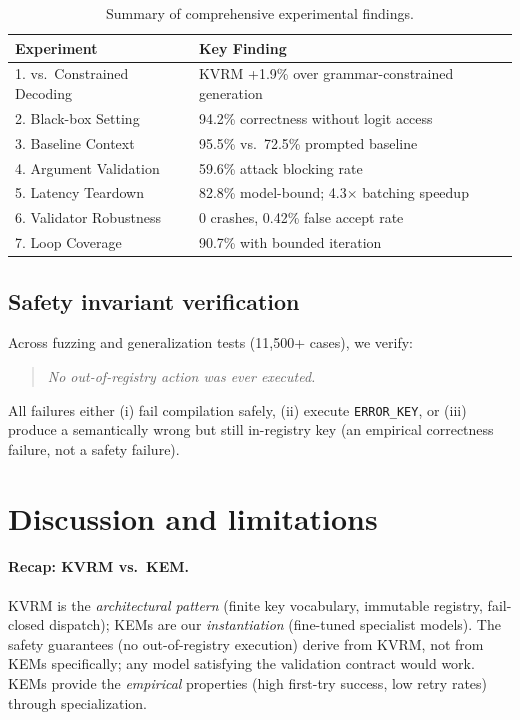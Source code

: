 \documentclass[11pt]{article}
\begin{document}
\begin{table}[h]
\centering
\caption{Summary of comprehensive experimental findings.}
\label{tab:v5_summary}
\begin{tabular}{p{5.5cm}p{8.5cm}}
\toprule
Experiment & Key Finding \\
\midrule
1. vs.\ Constrained Decoding & KVRM +1.9\% over grammar-constrained generation \\
2. Black-box Setting & 94.2\% correctness without logit access \\
3. Baseline Context & 95.5\% vs.\ 72.5\% prompted baseline \\
4. Argument Validation & 59.6\% attack blocking rate \\
5. Latency Teardown & 82.8\% model-bound; 4.3$\times$ batching speedup \\
6. Validator Robustness & 0 crashes, 0.42\% false accept rate \\
7. Loop Coverage & 90.7\% with bounded iteration \\
\bottomrule
\end{tabular}
\end{table}

\subsection{Safety invariant verification}
Across fuzzing and generalization tests (11{,}500+ cases), we verify:
\begin{quote}
\emph{No out-of-registry action was ever executed.}
\end{quote}
All failures either (i) fail compilation safely, (ii) execute \texttt{ERROR\_KEY}, or (iii) produce a semantically wrong but still in-registry key (an empirical correctness failure, not a safety failure).

\section{Discussion and limitations}\label{sec:discussion}

\paragraph{Recap: KVRM vs.\ KEM.}
KVRM is the \emph{architectural pattern} (finite key vocabulary, immutable registry, fail-closed dispatch); KEMs are our \emph{instantiation} (fine-tuned specialist models).
The safety guarantees (no out-of-registry execution) derive from KVRM, not from KEMs specifically; any model satisfying the validation contract would work.
KEMs provide the \emph{empirical} properties (high first-try success, low retry rates) through specialization.
\end{document}
